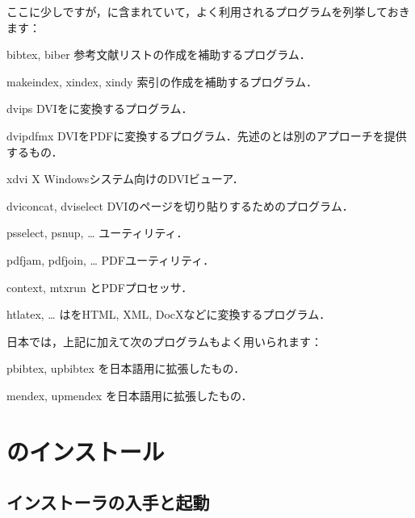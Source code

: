 \documentclass[uplatex,dvipdfmx,tombow]{jsarticle}
\begin{document}
ここに少しですが，\TL に含まれていて，よく利用されるプログラムを列挙しておきます：
%
\begin{cmddescription}
\item[bibtex, biber]
参考文献リストの作成を補助するプログラム．

\item[makeindex, xindex, xindy]
索引の作成を補助するプログラム．

\item[dvips]
DVIを\PS に変換するプログラム．

\item[dvipdfmx]
DVIをPDFに変換するプログラム．先述の\pdfTeX とは別のアプローチを提供するもの．

\item[xdvi]
X Windowsシステム向けのDVIビューア．

\item[dviconcat, dviselect]
DVIのページを切り貼りするためのプログラム．

\item[psselect, psnup, \ldots]
\PS ユーティリティ．

\item[pdfjam, pdfjoin, \ldots]
PDFユーティリティ．

\item[context, mtxrun]
\ConTeXt とPDFプロセッサ．

\item[htlatex, \ldots]
は\AllTeX をHTML, XML, DocXなどに変換するプログラム．
\end{cmddescription}

\begin{janote}
日本では，上記に加えて次のプログラムもよく用いられます：
%
\begin{cmddescription}
\item[pbibtex, upbibtex]
を日本語用に拡張したもの．

\item[mendex, upmendex]
を日本語用に拡張したもの．
\end{cmddescription}
\end{janote}

\section{\TL のインストール}
\label{sec:install}

\subsection{インストーラの入手と起動}
\label{sec:inst-start}
\end{document}
